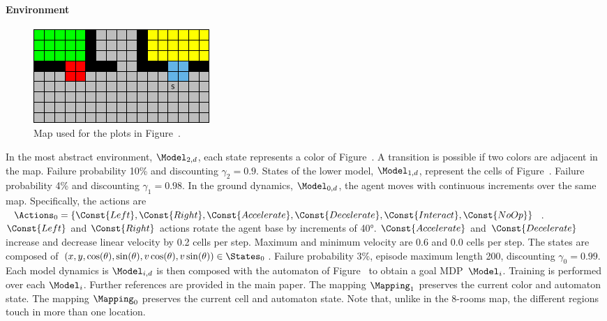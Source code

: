 \paragraph{Environment}

\begin{figure}
	\centering
	\includegraphics{./imgs/office-grid.pdf}
	\caption{Map used for the plots in Figure~.}
	\label{fig:office-map}
\end{figure}
In the most abstract environment, $\Model_{2,d}$,
each state represents a color of Figure~.
A transition is possible if two colors are adjacent in the map. 
Failure probability 10\% and discounting $\gamma_2 = 0.9$.
States of the lower model, $\Model_{1,d}$, represent the cells of Figure~. 
Failure probability 4\% and discounting $\gamma_1 = 0.98$.
In the ground dynamics, $\Model_{0,d}$, the agent moves with continuous increments over the same map.
Specifically, the actions are $\Actions_0 = \{ \Const{Left}, \Const{Right}, \Const{Accelerate}, \Const{Decelerate}, \Const{Interact}, \Const{NoOp} \}$.
$\Const{Left}$ and $\Const{Right}$ actions rotate the agent base by increments of 40°.
$\Const{Accelerate}$ and $\Const{Decelerate}$ increase and decrease linear velocity by 0.2 cells per step.
Maximum and minimum velocity are 0.6 and 0.0 cells per step.
The states are composed of $(x, y, \cos(\theta), \sin(\theta), v \cos(\theta), v \sin(\theta)) \in \States_0$.
Failure probability 3\%, episode maximum length 200, discounting $\gamma_0 = 0.99$.
Each model dynamics is $\Model_{i,d}$ is then composed with the automaton
of Figure~ to obtain a goal MDP~$\Model_i$.
Training is performed over each $\Model_i$. Further references are provided in the main paper.
The mapping $\Mapping_1$ preserves the current color and automaton state.
The mapping $\Mapping_0$ preserves the current cell and automaton state.
Note that, unlike in the 8-rooms map, the different regions touch in more than one location.


